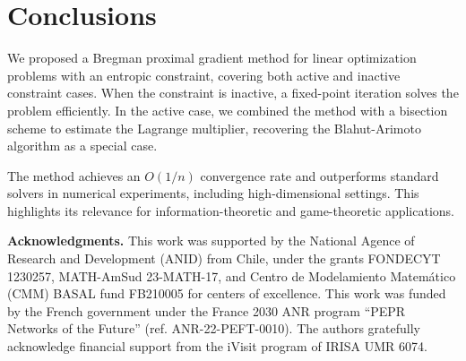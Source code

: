 \documentclass[smallextended,referee,envcountsect,]{svjour3}
\begin{document}
\section{Conclusions}
We proposed a Bregman proximal gradient method for linear 
optimization problems with an entropic constraint, covering both 
active and inactive constraint cases. When the constraint is 
inactive, a fixed-point iteration solves the problem efficiently. In the 
active case, we combined the method with a bisection scheme to 
estimate the Lagrange multiplier, recovering the Blahut-Arimoto 
algorithm as a special case.

The method achieves an $O(1/n)$ {convergence} rate and 
outperforms standard solvers in numerical experiments, including 
high-dimensional settings. This highlights its relevance for 
information-theoretic and game-theoretic applications.


{\small
\textbf{Acknowledgments.}
This work was supported by the National 
Agence of Research and Development (ANID) from Chile, under 
the grants FONDECYT 1230257, MATH-AmSud 23-MATH-17, 
and Centro de Modelamiento Matem\'{a}tico (CMM) BASAL fund 
FB210005 for centers of excellence.
This work was funded by the French government under the France 2030 ANR program ``PEPR Networks of the Future'' (ref. ANR-22-PEFT-0010). The authors gratefully acknowledge financial support from the iVisit program of IRISA UMR 6074.}




%
%

\end{document}
